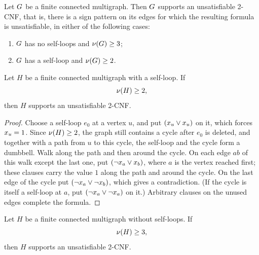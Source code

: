 \begin{unsatsupportrestatement}
Let \(G\) be a finite connected multigraph. Then \(G\) supports an
unsatisfiable 2-CNF, that is, there is a sign pattern on its edges for which
the resulting formula is unsatisfiable, in either of the following cases:
\begin{enumerate}[label=(\arabic*),leftmargin=3em]
\item \(G\) has no self-loops and \(\nu(G)\ge3\);
\item \(G\) has a self-loop and \(\nu(G)\ge2\).
\end{enumerate}
\end{unsatsupportrestatement}

\begin{lemma}\label{lem:selfloop-support}
Let \(H\) be a finite connected multigraph with a self-loop. If
\[
  \nu(H)\ge2,
\]
then \(H\) supports an unsatisfiable 2-CNF.
\end{lemma}

\begin{proof}
Choose a self-loop \(e_0\) at a vertex \(u\), and put \((x_{u}\vee x_{u})\)
on it, which forces \(x_{u}=1\). Since \(\nu(H)\ge2\), the graph still
contains a cycle after \(e_0\) is deleted, and together with a path from \(u\)
to this cycle, the self-loop and the cycle form a dumbbell. Walk along the path
and then around the cycle. On each edge \(ab\) of this walk except the last
one, put \((\neg x_{a}\vee x_{b})\), where \(a\) is the vertex reached
first; these clauses carry the value \(1\) along the path and around the cycle.
On the last edge of the cycle put \((\neg x_{a}\vee\neg x_{b})\), which
gives a contradiction. (If the cycle is itself a self-loop at \(a\), put
\((\neg x_{a}\vee\neg x_{a})\) on it.) Arbitrary clauses on the unused
edges complete the formula.
\end{proof}

\begin{lemma}\label{lem:multisupport}
Let \(H\) be a finite connected multigraph without self-loops. If
\[
  \nu(H)\ge3,
\]
then \(H\) supports an unsatisfiable 2-CNF.
\end{lemma}

